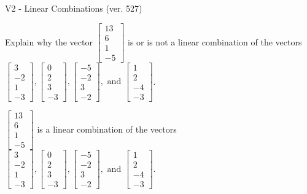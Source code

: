 \begin{exercise}
  \begin{exerciseTitle}V2 - Linear Combinations (ver. 527)\end{exerciseTitle}
  \begin{exerciseStatement}
    Explain why the vector \(\left[\begin{array}{c}
13 \\
6 \\
1 \\
-5
\end{array}\right]\)  is or is not a linear 
	combination of the vectors \(\left[\begin{array}{c}
3 \\
-2 \\
1 \\
-3
\end{array}\right] , \left[\begin{array}{c}
0 \\
2 \\
3 \\
-3
\end{array}\right] , \left[\begin{array}{c}
-5 \\
-2 \\
3 \\
-2
\end{array}\right] , \text{ and } \left[\begin{array}{c}
1 \\
2 \\
-4 \\
-3
\end{array}\right]\).
	


  \end{exerciseStatement}
  \begin{exerciseAnswer}
   \(\left[\begin{array}{c}
13 \\
6 \\
1 \\
-5
\end{array}\right]\) 
  	 is  
	a linear combination of the vectors \(\left[\begin{array}{c}
3 \\
-2 \\
1 \\
-3
\end{array}\right] , \left[\begin{array}{c}
0 \\
2 \\
3 \\
-3
\end{array}\right] , \left[\begin{array}{c}
-5 \\
-2 \\
3 \\
-2
\end{array}\right] , \text{ and } \left[\begin{array}{c}
1 \\
2 \\
-4 \\
-3
\end{array}\right]\).


\end{exerciseAnswer}
\end{exercise}
